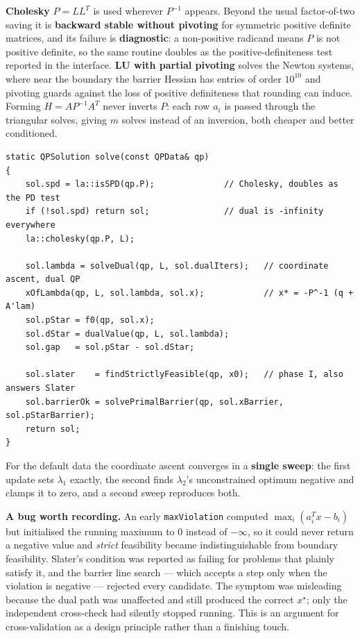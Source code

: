 \documentclass[11pt,a4paper]{article}
\theoremstyle{definition}
\newcommand{\xstar}{x^{\star}}
\begin{document}
\textbf{Cholesky} $P=LL^{T}$ is used wherever $P^{-1}$ appears. Beyond the usual factor-of-two
saving it is \textbf{backward stable without pivoting} for symmetric positive definite matrices,
and its failure is \textbf{diagnostic}: a non-positive radicand means $P$ is not positive
definite, so the same routine doubles as the positive-definiteness test reported in the
interface. \textbf{LU with partial pivoting} solves the Newton systems, where near the boundary
the barrier Hessian has entries of order $10^{10}$ and pivoting guards against the loss of
positive definiteness that rounding can induce. Forming $H=AP^{-1}A^{T}$ never inverts $P$: each
row $a_{i}$ is passed through the triangular solves, giving $m$ solves instead of an inversion,
both cheaper and better conditioned.

\begin{lstlisting}
static QPSolution solve(const QPData& qp)
{
    sol.spd = la::isSPD(qp.P);              // Cholesky, doubles as the PD test
    if (!sol.spd) return sol;               // dual is -infinity everywhere
    la::cholesky(qp.P, L);

    sol.lambda = solveDual(qp, L, sol.dualIters);   // coordinate ascent, dual QP
    xOfLambda(qp, L, sol.lambda, sol.x);            // x* = -P^-1 (q + A'lam)
    sol.pStar = f0(qp, sol.x);
    sol.dStar = dualValue(qp, L, sol.lambda);
    sol.gap   = sol.pStar - sol.dStar;

    sol.slater    = findStrictlyFeasible(qp, x0);   // phase I, also answers Slater
    sol.barrierOk = solvePrimalBarrier(qp, sol.xBarrier, sol.pStarBarrier);
    return sol;
}
\end{lstlisting}

For the default data the coordinate ascent converges in a \textbf{single sweep}: the first update
sets $\lambda_{1}$ exactly, the second finds $\lambda_{2}$'s unconstrained optimum negative and
clamps it to zero, and a second sweep reproduces both.

\textbf{A bug worth recording.} An early \texttt{maxViolation} computed
$\max_{i}(a_{i}^{T}x-b_{i})$ but initialised the running maximum to $0$ instead of $-\infty$, so
it could never return a negative value and \emph{strict} feasibility became indistinguishable
from boundary feasibility. Slater's condition was reported as failing for problems that plainly
satisfy it, and the barrier line search --- which accepts a step only when the violation is
negative --- rejected every candidate. The symptom was misleading because the dual path was
unaffected and still produced the correct $\xstar$; only the independent cross-check had silently
stopped running. This is an argument for cross-validation as a design principle rather than a
finishing touch.
\end{document}
